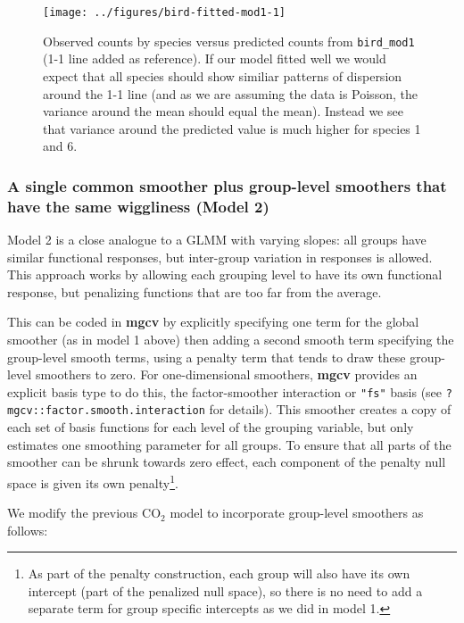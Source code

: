 \documentclass[12pt]{article}
\let\rmarkdownfootnote\footnote%
\def\footnote{\protect\rmarkdownfootnote}
\begin{document}
\begin{figure}
\texttt{[image: ../figures/bird-fitted-mod1-1]} \caption{\label{fig:bird-fitted-mod1}Observed counts by species versus predicted counts from \texttt{bird\_mod1} (1-1 line added as reference). If our model fitted well we would expect that all species should show similiar patterns of dispersion around the 1-1 line (and as we are assuming the data is Poisson, the variance around the mean should equal the mean). Instead we see that variance around the predicted value is much higher for species 1 and 6.}\label{fig:bird-fitted-mod1}
\end{figure}

\subsubsection{A single common smoother plus group-level smoothers that
have the same wiggliness (Model
2)}\label{a-single-common-smoother-plus-group-level-smoothers-that-have-the-same-wiggliness-model-2}

Model 2 is a close analogue to a GLMM with varying slopes: all groups
have similar functional responses, but inter-group variation in
responses is allowed. This approach works by allowing each grouping
level to have its own functional response, but penalizing functions that
are too far from the average.

This can be coded in \textbf{mgcv} by explicitly specifying one term for
the global smoother (as in model 1 above) then adding a second smooth
term specifying the group-level smooth terms, using a penalty term that
tends to draw these group-level smoothers to zero. For one-dimensional
smoothers, \textbf{mgcv} provides an explicit basis type to do this, the
factor-smoother interaction or \texttt{"fs"} basis (see
\texttt{?mgcv::factor.smooth.interaction} for details). This smoother
creates a copy of each set of basis functions for each level of the
grouping variable, but only estimates one smoothing parameter for all
groups. To ensure that all parts of the smoother can be shrunk towards
zero effect, each component of the penalty null space is given its own
penalty\footnote{As part of the penalty construction, each group will
  also have its own intercept (part of the penalized null space), so
  there is no need to add a separate term for group specific intercepts
  as we did in model 1.}.

We modify the previous \(\text{CO}_2\) model to incorporate group-level
smoothers as follows:
\end{document}
